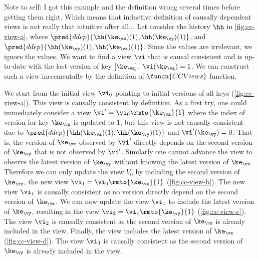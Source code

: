 \ac{Note to self: I got this example and the definition wrong several times before getting them
right. Which means that inductive definition of causally dependent views is not really that 
intuitive after all...}
Let consider the history $\hh$ in \cref{fig:cc-view-a}, where $\pred{ddep}{\hh(\ke_\vz)(1),\hh(\ke_{\vy})(1)}$, and $\pred{ddep}{\hh(\ke_{\vy})(1) ,\hh(\ke_{\vx})(1)}$.
Since the values are irrelevant, we ignore the values.
We want to find a view $\vi$ that is causal consistent and is up-to-date with the last version of key $[\ke_{\vz}]$, \ie \( \vi(\ke_\vz) = 1\).
We can construct such a view incrementally by the definition of \( \funcn{CCViews} \) function.

We start from the initial view $\vi_0$ pointing to initial versions of all keys (\cref{fig:cc-view-a}).
This view is causally consistent by definition.
As a first try, one could immediately consider a view $\vi'= \vi_0\rmto{\ke_\vz}{1}$ where the index of version for key $\ke_\vz$ is updated to $1$, but this view is not causally consistent due to \( \pred{ddep}{\hh(\ke_\vz)(1),\hh(\ke_{\vy})(1)} \) and \( \vi'(\ke_\vy) = 0\).
That is, the version of $\ke_\vz$ observed by $\vi'$ directly depends on the second version of $\ke_\vy$ that is not observed by $\vi'$.
Similarly one cannot advance the view to observe the latest version of \( \ke_\vy\) without knowing the latest version of \( \ke_\vx\).
Therefore we can only update the view $V_0$ by including the second version of $\ke_{\vx}$, \ie the new view \(\vi_1 = \vi_0\rmto{\ke_\vx}{1} \) (\cref{fig:cc-view-b}).
The new view \( \vi_1\) is causally consistent as no version directly depend on the second version of \( \ke_\vx\).
We can now update the view $\vi_1$ to include the latest version of $\ke_{\vy}$, resulting in the view $\vi_2 = \vi_1\rmto{\ke_{\vy}}{1}$ (\cref{fig:cc-view-c}). 
The view \( \vi_2\) is causally consistent as the second version of \( \ke_\vx\) is already included in the view.
Finally, the view includes the latest version of \( \ke_\vz \) (\cref{fig:cc-view-d}).
The view \( \vi_3\) is causally consistent as the second version of \( \ke_\vy\) is already included in the view.



